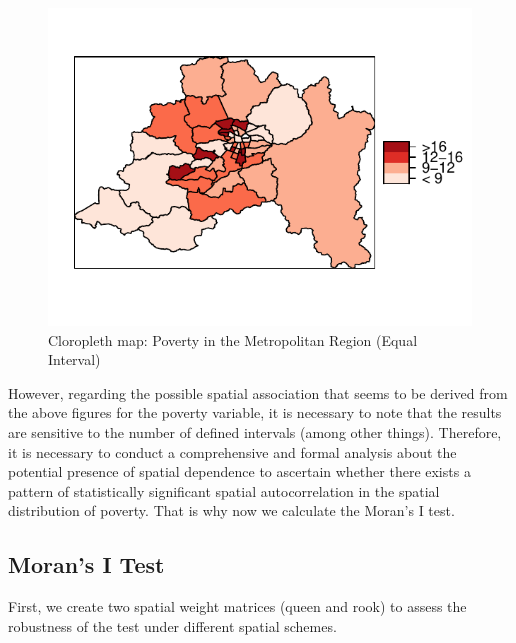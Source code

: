 \documentclass[english,12pt]{book}\usepackage[]{graphicx}\usepackage[]{xcolor}
\makeatletter
\def\maxwidth{ %
  \ifdim\Gin@nat@width>\linewidth
    \linewidth
  \else
    \Gin@nat@width
  \fi
}
\newenvironment{knitrout}{}{} %
\makeatother
\begin{document}
\begin{figure}[h]
\caption{Cloropleth map: Poverty in the Metropolitan Region (Equal Interval)}\label{fig:cloro-graph2}
\begin{knitrout}
\color{fgcolor}

{\centering \includegraphics[width=\maxwidth]{figure/cloro-graphs2T-1} 

}


\end{knitrout}
\end{figure}


However, regarding the possible spatial association that seems to be derived from the above figures for the poverty variable, it is necessary to note that the results are sensitive to the number of defined intervals (among other things). Therefore, it is necessary to conduct a comprehensive and formal analysis about the potential presence of spatial dependence to ascertain whether there exists a pattern of statistically significant spatial autocorrelation in the spatial distribution of poverty. That is why now we calculate the Moran’s I test.


\subsection{Moran's I Test}

First, we create two spatial weight matrices (queen and rook) to assess the robustness of the test under different spatial schemes. 
\end{document}
